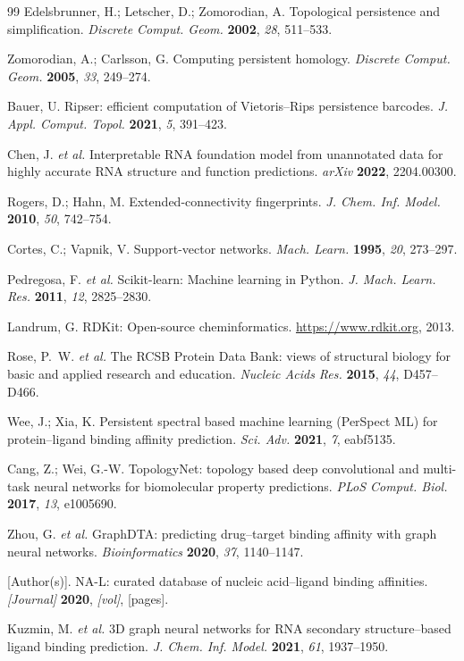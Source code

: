 \documentclass[10pt,twocolumn]{article}
\begin{document}
\begin{thebibliography}{99}
Edelsbrunner, H.; Letscher, D.; Zomorodian, A.
Topological persistence and simplification.
\textit{Discrete Comput. Geom.} \textbf{2002}, \textit{28}, 511--533.

Zomorodian, A.; Carlsson, G.
Computing persistent homology.
\textit{Discrete Comput. Geom.} \textbf{2005}, \textit{33}, 249--274.

Bauer, U.
Ripser: efficient computation of Vietoris--Rips persistence barcodes.
\textit{J. Appl. Comput. Topol.} \textbf{2021}, \textit{5}, 391--423.

Chen, J. \textit{et al.}
Interpretable RNA foundation model from unannotated data for highly accurate
RNA structure and function predictions.
\textit{arXiv} \textbf{2022}, 2204.00300.

Rogers, D.; Hahn, M.
Extended-connectivity fingerprints.
\textit{J. Chem. Inf. Model.} \textbf{2010}, \textit{50}, 742--754.

Cortes, C.; Vapnik, V.
Support-vector networks.
\textit{Mach. Learn.} \textbf{1995}, \textit{20}, 273--297.

Pedregosa, F. \textit{et al.}
Scikit-learn: Machine learning in Python.
\textit{J. Mach. Learn. Res.} \textbf{2011}, \textit{12}, 2825--2830.

Landrum, G. RDKit: Open-source cheminformatics.
\url{https://www.rdkit.org}, 2013.

Rose, P.~W. \textit{et al.}
The RCSB Protein Data Bank: views of structural biology for basic and applied
research and education.
\textit{Nucleic Acids Res.} \textbf{2015}, \textit{44}, D457--D466.

Wee, J.; Xia, K.
Persistent spectral based machine learning (PerSpect ML) for protein--ligand
binding affinity prediction.
\textit{Sci. Adv.} \textbf{2021}, \textit{7}, eabf5135.

Cang, Z.; Wei, G.-W.
TopologyNet: topology based deep convolutional and multi-task neural networks
for biomolecular property predictions.
\textit{PLoS Comput. Biol.} \textbf{2017}, \textit{13}, e1005690.

Zhou, G. \textit{et al.}
GraphDTA: predicting drug--target binding affinity with graph neural networks.
\textit{Bioinformatics} \textbf{2020}, \textit{37}, 1140--1147.

[Author(s)].
NA-L: curated database of nucleic acid--ligand binding affinities.
\textit{[Journal]} \textbf{2020}, \textit{[vol]}, [pages].

Kuzmin, M. \textit{et al.}
3D graph neural networks for RNA secondary structure--based ligand binding
prediction.
\textit{J. Chem. Inf. Model.} \textbf{2021}, \textit{61}, 1937--1950.

\end{thebibliography}
\endgroup
\end{document}
